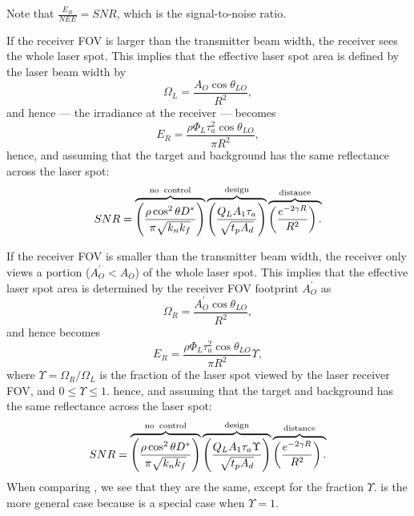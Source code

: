 Note that $\frac{E_R}{NEE}=SNR$, which is the signal-to-noise ratio.

If the receiver FOV  is larger than the transmitter beam width, the receiver sees the whole laser spot. This implies that the effective laser spot area is defined by the laser beam width by
\begin{equation}
\Omega_L=\frac{A_O\cos\theta_{LO}}{R^2},
\end{equation}
and hence  --- the irradiance at the receiver ---  becomes
\begin{equation}
E_R = \frac{
\rho \Phi_L \tau^2_{a} \cos\theta_{LO}}{\pi R^2 }\label{lrfi1}, 
\end{equation}
hence, and assuming that the target and background has the same reflectance across the laser spot:
\begin{equation}
SNR=
\overbrace{
\left(\frac{\rho \cos^2\theta D^\ast }{\pi \sqrt{k_nk_f}}\right)
}^{\rm no\;\;control}
\overbrace{
\left(\frac{Q_L A_1 \tau_a }{\sqrt{t_p A_d}}\right)
}^{\rm design}
\overbrace{
\left(\frac{e^{-2\gamma R} }{R^2}\right).\\
}^{\rm distance}
\label{lrfd2d}
\end{equation}


If the receiver FOV is smaller than the transmitter beam width, the receiver only views a portion ($A_O^\prime<A_O$) of the whole laser spot. This implies that the effective laser spot area is determined by the receiver FOV footprint  $A_O^\prime$ as 
\begin{equation}
\Omega_R=\frac{A_O^\prime\cos\theta_{LO}}{R^2},
\label{eq:lrfFOVsmaller}
\end{equation}
and hence  becomes
\begin{equation}
E_R = \frac{
\rho \Phi_L \tau^2_{a} \cos\theta_{LO}}{\pi R^2 }\Upsilon , %
\label{lrfi2}
\end{equation}
where $\Upsilon =\Omega_R/\Omega_L$ is the fraction of the laser spot
viewed by the laser receiver FOV, and $0\leq\Upsilon\leq 1$. 
hence, and assuming that the target and background has the same reflectance across the laser spot:
\begin{equation}
SNR=
\overbrace{
\left(\frac{\rho \cos^2\theta D^\ast }{\pi \sqrt{k_nk_f}}\right)
}^{\rm no\;\;control}
\overbrace{
\left(\frac{Q_L A_1 \tau_a \Upsilon}{\sqrt{t_p A_d}}\right)
}^{\rm design}
\overbrace{
\left(\frac{e^{-2\gamma R} }{R^2}\right).\\
}^{\rm distance}
\label{lrfd2e}
\end{equation}
When comparing
, we see that they are the same, except
for the fraction $\Upsilon$.  is the more general case
because  is a special case when $\Upsilon=1$.



